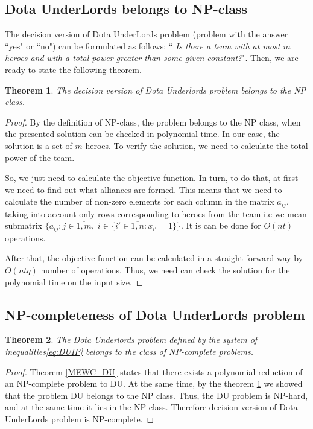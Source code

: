 \documentclass{article}
\newtheorem{theorem}{Theorem}
\begin{document}
\subsection{Dota UnderLords belongs to NP-class}
The decision version of Dota UnderLords problem (problem with the answer ``yes" or ``no") can be formulated as follows: `` \textit{Is there a team with at most $ m $ heroes and with a total power greater than some given constant?}". Then, we are ready to state the following theorem.
\begin{theorem}
\label{DU_is_NP}
The decision version of Dota Underlords problem belongs to the  NP class.
\end{theorem}
\begin{proof}

By the definition of NP-class, the problem belongs to the NP class, when the presented solution can be checked in polynomial time. In our case, the solution is a set of $m$ heroes. To verify the solution, we need to calculate the total power of the team. 

So, we just need to calculate the objective function. In turn, to do that, at first we need to find out what alliances are formed. This means that we need to calculate the number of non-zero elements for each column in the matrix $a_{ij}$, taking into account only rows corresponding to heroes from the team i.e  we mean submatrix $\{a_{ij}:  j \in \overline{1,m},\; i \in \{  i' \in \overline{1,n} :   x_{i'} = 1 \}  \}$. It is can be done for $O(nt)$ operations. 

After that, the objective function can be calculated in a straight forward way by $O(ntq)$ number of operations. Thus, we need can check the solution for the polynomial time on the input size. 
\end{proof}

\subsection{NP-completeness of Dota UnderLords problem}
\begin{theorem}
	The Dota Underlords problem defined by the system of inequalities\eqref{eq:DUIP}  belongs to the class of NP-complete problems.
\end{theorem}

\begin{proof}
Theorem \ref{MEWC_DU} states that there exists a polynomial reduction of an NP-complete problem to DU. At the same time, by the theorem \ref{DU_is_NP} we showed that the problem DU belongs to the NP class. Thus, the DU problem is NP-hard, and at the same time it lies in the NP class. Therefore decision version of Dota UnderLords problem is NP-complete.	
\end{proof}
\end{document}
